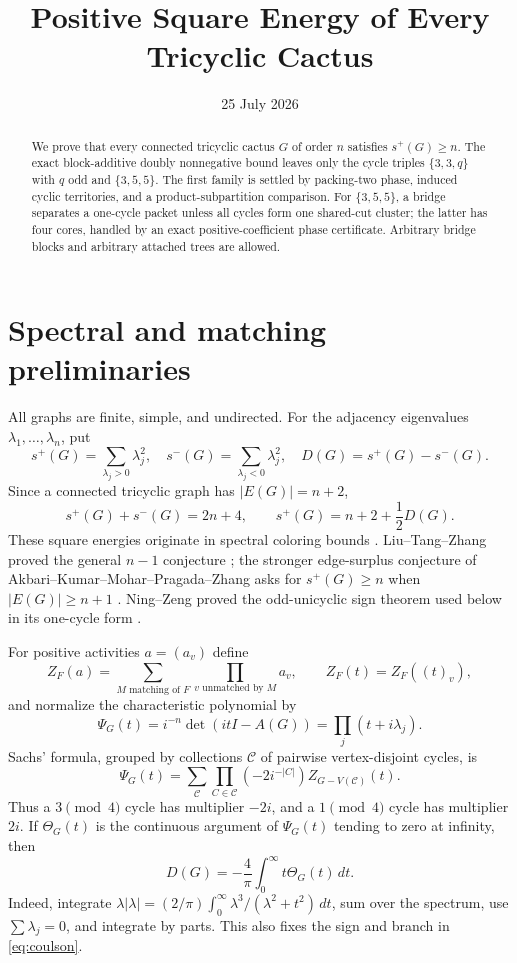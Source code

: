 \documentclass[11pt]{article}
\title{Positive Square Energy of Every Tricyclic Cactus}
\author{}
\date{25 July 2026}
\begin{document}
\maketitle

\begin{abstract}
We prove that every connected tricyclic cactus $G$ of order $n$ satisfies
$s^+(G)\geq n$.  The exact block-additive doubly nonnegative bound leaves
only the cycle triples $\{3,3,q\}$ with $q$ odd and $\{3,5,5\}$.  The first
family is settled by packing-two phase, induced cyclic territories, and a
product-subpartition comparison.  For $\{3,5,5\}$, a bridge separates a
one-cycle packet unless all cycles form one shared-cut cluster; the latter has
four cores, handled by an exact positive-coefficient phase certificate.
Arbitrary bridge blocks and arbitrary attached trees are allowed.
\end{abstract}

\section{Spectral and matching preliminaries}

All graphs are finite, simple, and undirected.  For the adjacency eigenvalues
$\lambda_1,\ldots,\lambda_n$, put
\[
 s^+(G)=\sum_{\lambda_j>0}\lambda_j^2,\quad
 s^-(G)=\sum_{\lambda_j<0}\lambda_j^2,\quad D(G)=s^+(G)-s^-(G).
\]
Since a connected tricyclic graph has $|E(G)|=n+2$,
\begin{equation}\label{eq:average}
 s^+(G)+s^-(G)=2n+4,\qquad s^+(G)=n+2+\frac12D(G).
\end{equation}
These square energies originate in spectral coloring bounds
\cite{AbiadEtAl}.  Liu--Tang--Zhang proved the general $n-1$ conjecture
\cite{LTZ}; the stronger edge-surplus conjecture of
Akbari--Kumar--Mohar--Pragada--Zhang asks for $s^+(G)\geq n$ when
$|E(G)|\geq n+1$ \cite{AKMPZ}.  Ning--Zeng proved the odd-unicyclic sign
theorem used below in its one-cycle form \cite{NingZeng}.

For positive activities $a=(a_v)$ define
\[
 Z_F(a)=\sum_{M\text{ matching of }F}\prod_{v\text{ unmatched by }M}a_v,
 \qquad Z_F(t)=Z_F((t)_v),
\]
and normalize the characteristic polynomial by
\[
 \Psi_G(t)=i^{-n}\det(itI-A(G))=\prod_j(t+i\lambda_j).
\]
Sachs' formula, grouped by collections $\mathcal C$ of pairwise
vertex-disjoint cycles, is
\begin{equation}\label{eq:sachs}
 \Psi_G(t)=\sum_{\mathcal C}\prod_{C\in\mathcal C}(-2i^{-|C|})
 Z_{G-V(\mathcal C)}(t).
\end{equation}
Thus a $3\pmod4$ cycle has multiplier $-2i$, and a $1\pmod4$ cycle has
multiplier $2i$.  If $\Theta_G(t)$ is the continuous argument of $\Psi_G(t)$
tending to zero at infinity, then
\begin{equation}\label{eq:coulson}
 D(G)=-\frac4\pi\int_0^\infty t\Theta_G(t)\,dt.
\end{equation}
Indeed, integrate
$\lambda|\lambda|=(2/\pi)\int_0^\infty
\lambda^3/(\lambda^2+t^2)\,dt$, sum over the spectrum, use
$\sum\lambda_j=0$, and integrate by parts.  This also fixes the sign and
branch in \eqref{eq:coulson}.
\end{document}
